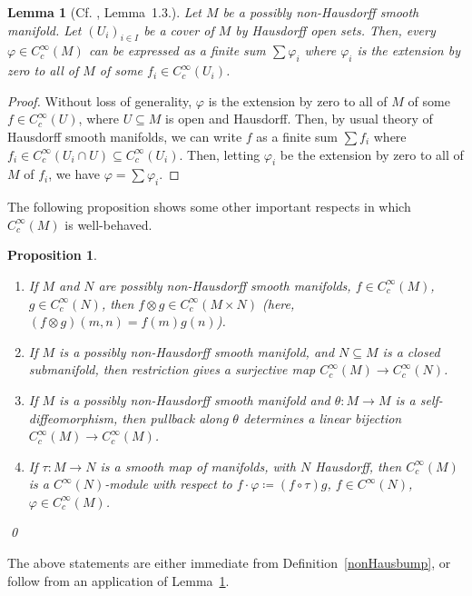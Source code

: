 \documentclass[12pt]{article}
\theoremstyle{plain}
\newtheorem{lemma}[thm]{Lemma}
\newtheorem{propn}[thm]{Proposition}
\theoremstyle{definition}
\numberwithin{equation}{section}
\begin{document}
\begin{lemma}[Cf. \cite{Khoshkam-Skandalis[2002]}, Lemma~1.3.]\label{cover}
Let $M$ be a possibly non-Hausdorff smooth manifold. Let $(U_i)_{i \in I}$ be a cover of $M$ by Hausdorff open sets. Then, every $\varphi \in C_c^\infty(M)$ can be expressed as a finite sum $\sum \varphi_i$ where $\varphi_i$ is the extension by zero to all of $M$ of some $f_i \in C_c^\infty(U_i)$.
\end{lemma}
\begin{proof}
Without loss of generality, $\varphi$ is the extension by zero to all of $M$ of some $f \in C_c^\infty(U)$, where $U \subseteq M$ is open and Hausdorff.  Then, by usual theory of Hausdorff smooth manifolds, we can write $f$ as a finite sum $\sum f_i$ where $f_i \in C_c^\infty(U_i \cap U) \subseteq C_c^\infty(U_i)$. Then, letting $\varphi_i$ be the extension by zero to all of $M$ of $f_i$, we have $\varphi = \sum \varphi_i$.
\end{proof}


The following proposition shows some other important respects in which $C_c^\infty(M)$ is well-behaved.


\begin{propn}\label{convsetup} \text{ }
\begin{enumerate}
\item If $M$ and $N$ are possibly non-Hausdorff smooth manifolds, $f \in C_c^\infty(M)$, $g \in C_c^\infty(N)$, then $f \otimes g \in C_c^\infty(M\times N)$ (here, $(f\otimes g)(m,n)=f(m)g(n)$).
\item If $M$ is a possibly non-Hausdorff smooth manifold, and $N \subseteq M$ is a closed submanifold, then  restriction gives a surjective map $C_c^\infty(M) \to C_c^\infty(N)$.
\item If $M$ is a possibly non-Hausdorff smooth manifold and $\theta : M \to M$ is a self-diffeomorphism, then pullback along $\theta$ determines a linear bijection $C_c^\infty(M) \to C_c^\infty(M)$. 
\item If $\tau:M\to N$ is a smooth map of manifolds, with $N$ Hausdorff, then $C_c^\infty(M)$ is a $C^\infty(N)$-module with respect to $f \cdot \varphi \coloneqq (f \circ \tau)g$, $f \in C^\infty(N)$, $\varphi \in C_c^\infty(M)$.
\end{enumerate} \qed
\end{propn}
The above statements are either immediate from Definition~\ref{nonHausbump}, or follow from an application of Lemma~\ref{cover}.
\end{document}
